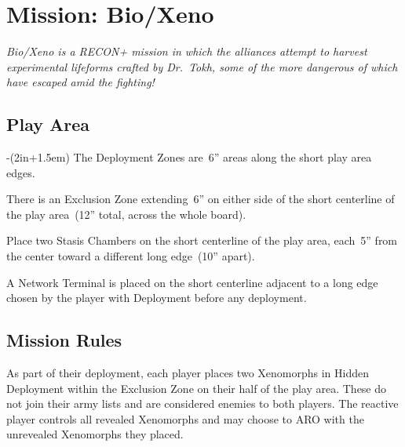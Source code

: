 \chapter{Mission: Bio/Xeno}

\emph{\emph{Bio/Xeno} is a RECON+ mission in which the alliances
  attempt to harvest experimental lifeforms crafted by Dr.~Tokh, some
  of the more dangerous of which have escaped amid the fighting!}

\section{Play Area}
\vspace{-2\parskip}
\noindent\begin{stdminipage}{\linewidth-(2in+1.5em)}
\vspace{0pt}   
\noindent
The Deployment Zones are~6'' areas along the short play area edges.

There is an Exclusion Zone extending~6'' on either side of the short
centerline of the play area~(12'' total, across the whole board).


Place two Stasis Chambers on the short centerline of the play area,
each~5'' from the center toward a different long edge~(10'' apart).

A Network Terminal is placed on the short centerline adjacent to a
long edge chosen by the player with Deployment before any deployment.

\section{Mission Rules}

As part of their deployment, each player places two Xenomorphs in
Hidden Deployment within the Exclusion Zone on their half of the play
area.  These do not join their army lists and are considered enemies
to both players.  The reactive player controls all revealed Xenomorphs
and may choose to ARO with the unrevealed Xenomorphs they placed.

\noindent\begin{minipage}{\linewidth}\center
\setlength\fboxrule{2pt}  
\end{minipage}
\end{stdminipage}
